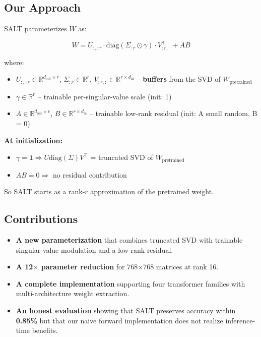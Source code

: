 \subsection{Our Approach}

SALT parameterizes $W$ as:

\[
W = U_{:,:r} \cdot \text{diag}(\Sigma_{:r} \odot \gamma) \cdot V_{:r,:}^\top + A B
\tag{1.2}
\]

where:

\begin{itemize}
\item $U_{:,:r} \in \mathbb{R}^{d_\text{out} \times r}$,
  $\Sigma_{:r} \in \mathbb{R}^r$,
  $V_{:r,:} \in \mathbb{R}^{r \times d_\text{in}}$ -- \textbf{buffers} from the SVD of $W_\text{pretrained}$
\item $\gamma \in \mathbb{R}^r$ -- trainable per-singular-value scale (init: 1)
\item $A \in \mathbb{R}^{d_\text{out} \times r}$,
  $B \in \mathbb{R}^{r \times d_\text{in}}$ -- trainable low-rank residual (init: A small random, B = 0)

\end{itemize}
\textbf{At initialization:}
\begin{itemize}
\item $\gamma = \mathbf{1} \Rightarrow U \text{diag}(\Sigma) V^\top$ = truncated SVD of $W_\text{pretrained}$
\item $A B = 0 \Rightarrow$ no residual contribution

\end{itemize}
So SALT starts as a rank-$r$ approximation of the pretrained weight.

\subsection{Contributions}

\begin{itemize}
\item \textbf{A new parameterization} that combines truncated SVD with trainable
  singular-value modulation and a low-rank residual.
\item \textbf{A 12$\times$ parameter reduction} for 768$\times$768 matrices at rank 16.
\item \textbf{A complete implementation} supporting four transformer families with
  multi-architecture weight extraction.
\item \textbf{An honest evaluation} showing that SALT preserves accuracy within
  \textbf{0.85\%} but that our naive forward implementation does not
  realize inference-time benefits.

\end{itemize}

